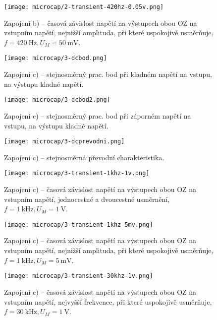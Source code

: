 \begin{figure}[h!]
    \centering
    \texttt{[image: microcap/2-transient-420hz-0.05v.png]}
    \caption{Zapojení b) -- časová závislost napětí na výstupech obou OZ na vstupním napětí, nejnižší amplituda, při které uspokojivě usměrňuje, \(f=\qty{420}{\hertz}, U_M=\qty{50}{\milli\volt}\).}
    \label{fig:microcap/.png}
\end{figure}

\begin{figure}[h!]
    \centering
    \texttt{[image: microcap/3-dcbod.png]}
    \caption{Zapojení c) -- stejnosměrný prac. bod při kladném napětí na vstupu, na výstupu kladné napětí.}
    \label{fig:microcap/.png}
\end{figure}

\begin{figure}[h!]
    \centering
    \texttt{[image: microcap/3-dcbod2.png]}
    \caption{Zapojení c) -- stejnosměrný prac. bod při záporném napětí na vstupu, na výstupu kladné napětí.}
    \label{fig:microcap/.png}
\end{figure}

\begin{figure}[h!]
    \centering
    \texttt{[image: microcap/3-dcprevodni.png]}
    \caption{Zapojení c) -- stejnosměrná převodní charakteristika.}
    \label{fig:microcap/.png}
\end{figure}

\begin{figure}[h!]
    \centering
    \texttt{[image: microcap/3-transient-1khz-1v.png]}
    \caption{Zapojení c) -- časová závislost napětí na výstupech obou OZ na vstupním napětí, jednocestné a dvoucestné usměrnění, \(f=\qty{1}{\kilo\hertz}, U_M=\qty{1}{\volt}\).}
    \label{fig:microcap/.png}
\end{figure}

\begin{figure}[h!]
    \centering
    \texttt{[image: microcap/3-transient-1khz-5mv.png]}
    \caption{Zapojení c) -- časová závislost napětí na výstupech obou OZ na vstupním napětí, nejnižší amplituda, při které uspokojivě usměrňuje, \(f=\qty{1}{\kilo\hertz}, U_M=\qty{5}{\milli\volt}\).}
    \label{fig:microcap/.png}
\end{figure}


\begin{figure}[h!]
    \centering
    \texttt{[image: microcap/3-transient-30khz-1v.png]}
    \caption{Zapojení c) -- časová závislost napětí na výstupech obou OZ na vstupním napětí, nejvyšší frekvence, při které uspokojivě usměrňuje, \(f=\qty{30}{\kilo\hertz}, U_M=\qty{1}{\volt}\).}
    \label{fig:microcap/.png}
\end{figure}


